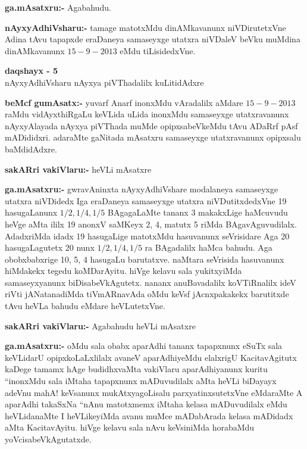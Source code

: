 \smallskip
\noindent
\textbf{ga.mAsatxru:-} Agabahudu.

\smallskip
\noindent
\textbf{nAyxyAdhiVsharu:-} tamage matotxMdu dinAMkavanunx niVDirutetxVne Adina tAvu tapapxde eraDaneya samaseyxge utatxra niVDaleV beVku muMdina dinAMkavanunx $15-9-2013$ eMdu tiLisidedxVne.

\begin{center}
{\bf  daqshayx - {\rm 5}}\\
nAyxyAdhiVsharu nAyxya piVThadalilx kuLitidAdxre
\end{center}

\smallskip
\noindent
\textbf{beMcf gumAsatx:-} yuvarf Anarf inonxMdu vAradalilx aMdare $15-9-2013$ raMdu vidAyxthiRgaLu keVLida uLida inonxMdu samaseyxge utatxravanunx nAyxyAlayada nAyxya piVThada muMde opipxsabeVkeMdu tAvu ADaRrf pAsf mADididxri. adaraMte gaNitada mAsatxru samaseyxge utatxravanunx opipxsalu baMdidAdxre.

\smallskip
\noindent
\textbf{sakARri vakiVlaru:-} heVLi mAsatxre

\smallskip
\noindent
\textbf{ga.mAsatxru:-} gwravAninxta nAyxyAdhiVshare modalaneya samaseyxge utatxra niVDidedx Iga eraDaneya samaseyxge utatxra niVDutitxdedxVne {\rm 19} hasugaLanunx $1/2, 1/4, 1/5$ BAgagaLaMte tananx {\rm 3} makakxLige haMcuvudu heVge aMta ililx {\rm 19} anonxV saMKeyx {\rm 2, 4}, matutx {\rm 5} riMda BAgavAguvudilalx. AdadxriMda idadx {\rm 19} hasugaLige matotxMdu hasuvanunx seVrisidare Aga {\rm 20} hasugaLagutetx {\rm 20} nunx $1/2, 1/4, 1/5$ ra BAgadalilx haMca bahudu. Aga obobxbabxrige {\rm 10, 5, 4} hasugaLu barutatxve. naMtara seVrisida hasuvanunx hiMdakekx tegedu koMDarAyitu. hiVge kelavu sala yukitxyiMda samaseyxyanunx biDisabeVkAgutetx. nananx anuBavadalilx koVTiRnalilx ideV riVti jANatanadiMda tiVmARnavAda oMdu keVsf jAcnxpakakekx barutitxde tAvu heVLa bahudu eMdare heVLutetxVne.

\smallskip
\noindent
\textbf{sakARri vakiVlaru:-} Agabahudu heVLi mAsatxre 

\smallskip
\noindent
\textbf{ga.mAsatxru:-} oMdu sala obabx aparAdhi tananx tapapxnunx eSuTx sala keVLidarU opipxkoLaLxlilalx avaneV aparAdhiyeMdu elalxrigU KacitavAgitutx kaDege tamamx hAge budidhxvaMta vakiVlaru aparAdhiyanunx kuritu ``inonxMdu sala iMtaha tapapxnunx mADuvudilalx aMta heVLi biDayayx adeVnu mahA! keVsanunx mukAtxyagoLisalu parxyatinxsutetxVne eMdaraMte A aparAdhi takaSxNa ``nAnu matotxmemx iMtaha kelasa mADuvudilalx eMdu heVLidanaMte  I heVLikeyiMda avanu muMce mADabArada kelasa mADidadx aMta KacitavAyitu. hiVge kelavu sala nAvu keVsiniMda horabaMdu yoVcisabeVkAgutatxde.

